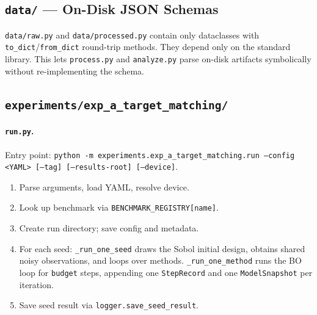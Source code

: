 \documentclass[11pt]{article}
\begin{document}
\subsection{\texttt{data/} --- On-Disk JSON Schemas}
 
\texttt{data/raw.py} and \texttt{data/processed.py} contain only dataclasses with
\texttt{to\_dict}/\texttt{from\_dict} round-trip methods.
They depend only on the standard library.
This lets \texttt{process.py} and \texttt{analyze.py} parse on-disk artifacts
symbolically without re-implementing the schema.
 
\subsection{\texttt{experiments/exp\_a\_target\_matching/}}
 
\paragraph{\texttt{run.py}.}
Entry point:
\texttt{python -m experiments.exp\_a\_target\_matching.run
  --config <YAML> [--tag] [--results-root] [--device]}.
\begin{enumerate}
  \item Parse arguments, load YAML, resolve device.
  \item Look up benchmark via \texttt{BENCHMARK\_REGISTRY[name]}.
  \item Create run directory; save config and metadata.
  \item For each seed: \texttt{\_run\_one\_seed} draws the Sobol initial design, obtains
        shared noisy observations, and loops over methods.
        \texttt{\_run\_one\_method} runs the BO loop for \texttt{budget} steps,
        appending one \texttt{StepRecord} and one \texttt{ModelSnapshot} per iteration.
  \item Save seed result via \texttt{logger.save\_seed\_result}.
\end{enumerate}
 
\end{document}
